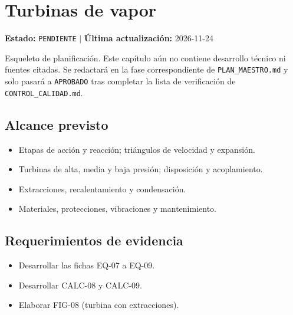 \chapter{Turbinas de vapor}
\label{cap:06}

\begin{cajaestado}
\textbf{Estado:} \texttt{PENDIENTE} \quad$|$\quad
\textbf{Última actualización:} 2026-11-24

Esqueleto de planificación. Este capítulo aún no contiene desarrollo técnico ni
fuentes citadas. Se redactará en la fase correspondiente de
\texttt{PLAN\_MAESTRO.md} y solo pasará a \texttt{APROBADO} tras completar
la lista de verificación de \texttt{CONTROL\_CALIDAD.md}.
\end{cajaestado}

\section{Alcance previsto}
\begin{itemize}
  \item Etapas de acción y reacción; triángulos de velocidad y expansión.
  \item Turbinas de alta, media y baja presión; disposición y acoplamiento.
  \item Extracciones, recalentamiento y condensación.
  \item Materiales, protecciones, vibraciones y mantenimiento.
\end{itemize}

\section{Requerimientos de evidencia}
\begin{itemize}
  \item Desarrollar las fichas EQ-07 a EQ-09.
  \item Desarrollar CALC-08 y CALC-09.
  \item Elaborar FIG-08 (turbina con extracciones).
\end{itemize}
